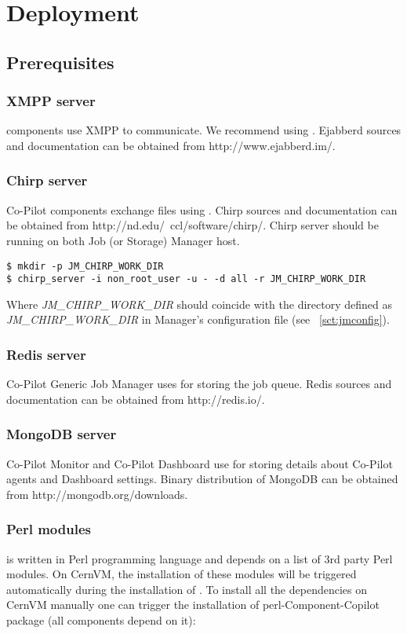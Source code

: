 \chapter{Deployment}
\section{Prerequisites}
\subsection{XMPP server}
\copilot components use XMPP to communicate. We recommend using  \cite{ejabberd}. Ejabberd sources and documentation can be obtained from
http://www.ejabberd.im/.

\subsection{Chirp server}
Co-Pilot components exchange files using \cite{chirp}. Chirp sources and documentation can be obtained from http://nd.edu/~ccl/software/chirp/. Chirp server should be running on both Job (or Storage) Manager host.

\lstset{caption=Starting Chirp server}
\begin{lstlisting}
$ mkdir -p JM_CHIRP_WORK_DIR
$ chirp_server -i non_root_user -u - -d all -r JM_CHIRP_WORK_DIR
\end{lstlisting}

Where \emph{JM\_CHIRP\_WORK\_DIR} should coincide with the directory defined as \emph{JM\_CHIRP\_WORK\_DIR} in Manager's configuration file (see ~\ref{sct:jmconfig}).

\subsection{Redis server}
Co-Pilot Generic Job Manager uses \cite{redis} for storing the job queue. Redis sources and documentation can be obtained from http://redis.io/.

\subsection{MongoDB server}
Co-Pilot Monitor and Co-Pilot Dashboard use \cite{mongodb} for storing details about Co-Pilot agents and Dashboard settings. Binary distribution of MongoDB can be obtained from http://mongodb.org/downloads.

\subsection{Perl modules}
\copilot is written in Perl programming language and depends on a list of 3rd party Perl modules. On CernVM, the installation of these modules will be triggered automatically during the installation of \copilot. To install all the dependencies on CernVM manually one can trigger the installation of perl-Component-Copilot package (all \copilot components depend on it):

